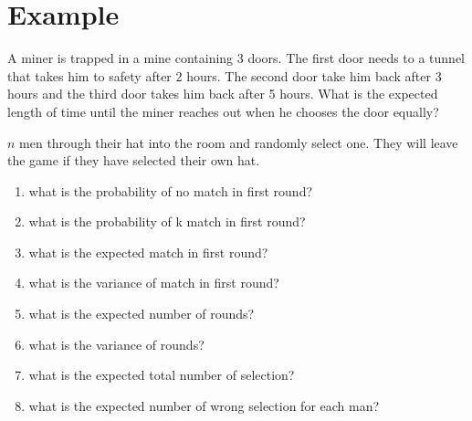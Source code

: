 \section{Example}

\begin{example}
    A miner is trapped in a mine containing 3 doors. The first door needs to a tunnel that takes him to safety after 2 hours. The second door take him back after 3 hours and the third door takes him back after 5 hours. What is the expected length of time until the miner reaches out when he chooses the door equally?
\end{example}

\begin{example}
    $n$ men through their hat into the room and randomly select one. They will leave the game if they have selected their own hat.
    \begin{enumerate}
        \item \label{hatq1} what is the probability of no match in first round?
        \item \label{hatq2} what is the probability of k match in first round?
        \item \label{hatq3} what is the expected match in first round?
        \item \label{hatq4} what is the variance of match in first round?
        \item \label{hatq5} what is the expected number of rounds?
        \item \label{hatq6} what is the variance of rounds?
        \item \label{hatq7} what is the expected total number of selection?
        \item \label{hatq8} what is the expected number of wrong selection for each man?
    \end{enumerate}    
\end{example}
